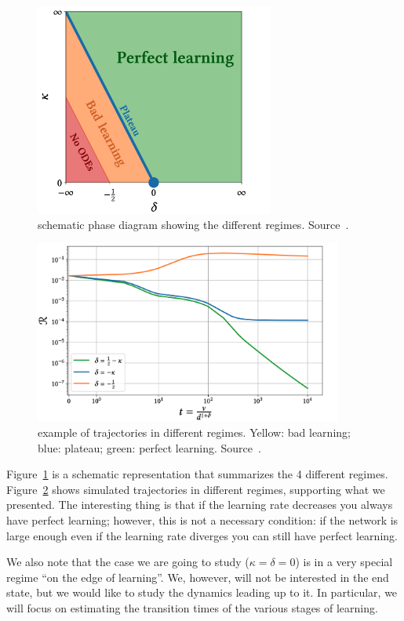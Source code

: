 \begin{figure}
  \centering
  \includegraphics[width=0.7\textwidth]{figures/veiga_phase_diagram.png}
  \caption{
    schematic phase diagram showing the different regimes.
    Source~\cite{veiga2022phase}.
  }
  \label{fig:veiga_phase_diagram}
\end{figure}
\begin{figure}
  \centering
  \includegraphics[width=0.9\textwidth]{figures/veiga_traj_examples.png}
  \caption{
    example of trajectories in different regimes. Yellow: bad learning; blue: plateau; green: perfect learning.
    Source~\cite{veiga2022phase}.
  }
  \label{fig:veiga_traj_examples}
\end{figure}
Figure~\ref{fig:veiga_phase_diagram} is a schematic representation that summarizes the 4 different regimes.
Figure~\ref{fig:veiga_traj_examples} shows simulated trajectories in different regimes, supporting what we presented.
The interesting thing is that if the learning rate decreases you always have perfect learning; however, this is not a necessary condition: if the network is large enough even if the learning rate diverges you can still have perfect learning.

We also note that the case we are going to study (\(\kappa=\delta=0\)) is in a very special regime ``on the edge of learning''.
We, however, will not be interested in the end state, but we would like to study the dynamics leading up to it.
In particular, we will focus on estimating the transition times of the various stages of learning.
